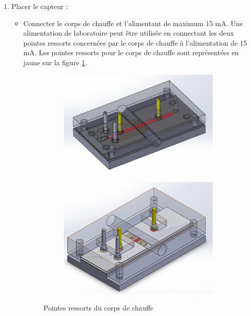 \begin{enumerate}
    \item Placer le capteur :
          \begin{itemize}
              \item Connecter le corps de chauffe et l'alimentant de maximum 15 mA. Une alimentation de laboratoire peut être utilisée en connectant
                    les deux pointes ressorts concernées par le corps de chauffe à l'alimentation de 15 mA. Les pointes ressorts pour le corps de chauffe
                    sont représentées en jaune sur la figure \ref*{fig:pointes_ressorts_chauffe}.
                    \begin{figure}[H]
                        \centering
                        \begin{subfigure}[b]{0.45\textwidth}
                            \includegraphics[scale = 0.3]{assets/figures/pointes_ressorts_chauffe.png}
                        \end{subfigure}
                        \begin{subfigure}{0.45\textwidth}
                            \includegraphics[scale = 0.3]{assets/figures/pointes_ressorts_chauffe_design5.png}
                        \end{subfigure}
                        \caption{Pointes ressorts du corps de chauffe}
                        \label{fig:pointes_ressorts_chauffe}
                    \end{figure}
          \end{itemize}



\end{enumerate}
